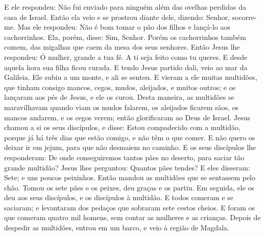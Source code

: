 {  E ele respondeu: Não fui enviado para ninguém além das ovelhas perdidas
 da casa de Israel.
  Então ela veio e se prostrou diante dele, dizendo: Senhor, socorre-me.
  Mas ele respondeu: Não é bom tomar o pão dos filhos e lançá-lo aos cachorrinhos.
  Ela, porém, disse: Sim, Senhor. Porém os cachorrinhos também comem, das migalhas que caem da mesa dos seus senhores.
  Então Jesus lhe respondeu: Ó mulher, grande
{} a tua fé. A ti seja feito como tu queres. E desde aquela hora sua filha ficou curada.
  E tendo Jesus partido dali, veio ao mar da Galileia. Ele subiu a um monte, e ali se sentou.
  E vieram a ele muitas multidões, que tinham consigo mancos, cegos, mudos, aleijados, e muitos outros; e os lançaram aos pés de Jesus, e ele os curou.
  Desta maneira, as multidões se maravilhavam quando viam os mudos falarem, os aleijados ficarem sãos, os mancos andarem, e os cegos verem; então glorificaram ao Deus de Israel.
  Jesus chamou a si os seus discípulos, e disse: Estou compadecido com a multidão, porque já há três dias que estão comigo, e não têm o que comer. E não quero os deixar ir em jejum, para que não desmaiem no caminho.
  E os seus discípulos lhe responderam: De onde conseguiremos tantos pães no deserto, para saciar tão grande multidão?
  Jesus lhes perguntou: Quantos pães tendes? E eles disseram: Sete; e uns poucos peixinhos.
  Então mandou as multidões que se sentassem pelo chão.
  Tomou os sete pães e os peixes, deu graças e os partiu. Em seguida, ele os deu aos seus discípulos, e os discípulos à multidão.
  E todos comeram e se saciaram; e levantaram dos pedaços que sobraram sete cestos cheios.
  E foram os que comeram quatro mil homens, sem contar as mulheres e as crianças.
  Depois de despedir as multidões,
{} entrou em um barco, e veio à região de Magdala.
\par }

